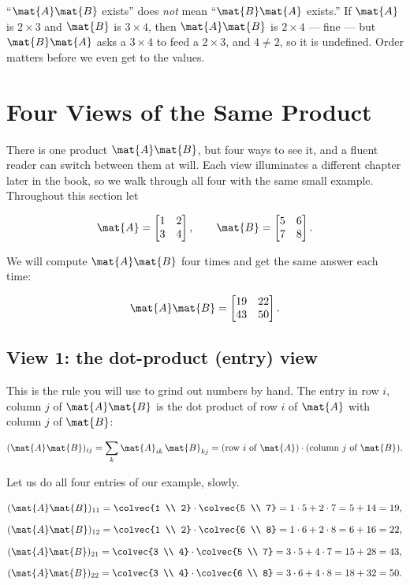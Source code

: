\begin{trapbox}
``$\mat{A}\mat{B}$ exists'' does \emph{not} mean ``$\mat{B}\mat{A}$ exists.'' If
$\mat{A}$ is $2\times 3$ and $\mat{B}$ is $3\times 4$, then $\mat{A}\mat{B}$ is
$2\times 4$ --- fine --- but $\mat{B}\mat{A}$ asks a $3\times4$ to feed a $2\times3$,
and $4 \ne 2$, so it is undefined. Order matters before we even get to the values.
\end{trapbox}

\section{Four Views of the Same Product}
\label{ch08:fourviews}

There is one product $\mat{A}\mat{B}$, but four ways to see it, and a fluent reader
can switch between them at will. Each view illuminates a different chapter later in the
book, so we walk through all four with the same small example. Throughout this section
let

\[
\mat{A} = \begin{bmatrix} 1 & 2 \\ 3 & 4 \end{bmatrix},
\qquad
\mat{B} = \begin{bmatrix} 5 & 6 \\ 7 & 8 \end{bmatrix}.
\]

We will compute $\mat{A}\mat{B}$ four times and get the same answer each time:

\[
\mat{A}\mat{B} = \begin{bmatrix} 19 & 22 \\ 43 & 50 \end{bmatrix}.
\]

\subsection{View 1: the dot-product (entry) view}

This is the rule you will use to grind out numbers by hand. The entry in row $i$,
column $j$ of $\mat{A}\mat{B}$ is the dot product of row $i$ of $\mat{A}$ with column
$j$ of $\mat{B}$:

\[
(\mat{A}\mat{B})_{ij} = \sum_{k} \mat{A}_{ik}\,\mat{B}_{kj}
= (\text{row } i \text{ of } \mat{A}) \cdot (\text{column } j \text{ of } \mat{B}).
\]

Let us do all four entries of our example, slowly.

\[
(\mat{A}\mat{B})_{11} = \colvec{1 \\ 2}\cdot\colvec{5 \\ 7} = 1\cdot5 + 2\cdot7 = 5+14 = 19,
\]
\[
(\mat{A}\mat{B})_{12} = \colvec{1 \\ 2}\cdot\colvec{6 \\ 8} = 1\cdot6 + 2\cdot8 = 6+16 = 22,
\]
\[
(\mat{A}\mat{B})_{21} = \colvec{3 \\ 4}\cdot\colvec{5 \\ 7} = 3\cdot5 + 4\cdot7 = 15+28 = 43,
\]
\[
(\mat{A}\mat{B})_{22} = \colvec{3 \\ 4}\cdot\colvec{6 \\ 8} = 3\cdot6 + 4\cdot8 = 18+32 = 50.
\]

